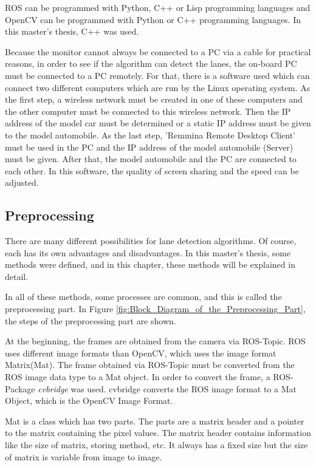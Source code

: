 ROS can be programmed with Python, C++ or Lisp programming languages and OpenCV can be programmed with Python or C++ programming languages. In this master's thesis, C++ was used.

Because the monitor cannot always be connected to a PC via a cable for practical reasons, in order to see if the algorithm can detect the lanes, the on-board PC must be connected to a PC remotely. For that, there is a software used which can connect two different computers which are run by the Linux operating system. As the first step, a wireless network must be created in one of these computers and the other computer must be connected to this wireless network. Then the IP address of the model car must be determined or a static IP address must be given to the model automobile. As the last step, 'Remmina Remote Desktop Client' must be used in the PC and the IP address of the model automobile (Server) must be given. After that, the model automobile and the PC are connected to each other. In this software, the quality of screen sharing and the speed can be adjusted.  

%
\subsection{Preprocessing}\label{sec:Preprocessing}

There are many different possibilities for lane detection algorithms. Of course, each has its own advantages and disadvantages. In this master's thesis, some methods were defined, and in this chapter, these methods will be explained in detail.

In all of these methods, some processes are common, and this is called the preprocessing part. In Figure \ref{fig:Block_Diagram_of_the_Preprocessing_Part}, the steps of the preprocessing part are shown.

At the beginning, the frames are obtained from the camera via ROS-Topic. ROS uses different image formats than OpenCV, which uses the image format Matrix(Mat). The frame obtained via ROS-Topic must be converted from the ROS image data type to a Mat object. In order to convert the frame, a ROS-Package \textit{cvbridge}\cite{cv_bridge} was used. cvbridge converts the ROS image format to a Mat Object, which is the OpenCV Image Format. 

Mat is a class which has two parts. The parts are a matrix header and a pointer to the matrix containing the pixel values. The matrix header contains information like the size of matrix, storing method, etc. It always has a fixed size but the size of matrix is variable from image to image.

